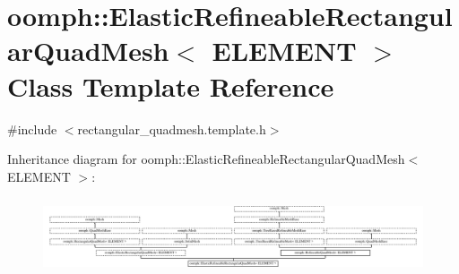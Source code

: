 \hypertarget{classoomph_1_1ElasticRefineableRectangularQuadMesh}{}\section{oomph\+:\+:Elastic\+Refineable\+Rectangular\+Quad\+Mesh$<$ E\+L\+E\+M\+E\+NT $>$ Class Template Reference}
\label{classoomph_1_1ElasticRefineableRectangularQuadMesh}


{\ttfamily \#include $<$rectangular\+\_\+quadmesh.\+template.\+h$>$}

Inheritance diagram for oomph\+:\+:Elastic\+Refineable\+Rectangular\+Quad\+Mesh$<$ E\+L\+E\+M\+E\+NT $>$\+:\begin{figure}[H]
\begin{center}
\leavevmode
\includegraphics[height=2.258065cm]{classoomph_1_1ElasticRefineableRectangularQuadMesh}
\end{center}
\end{figure}
